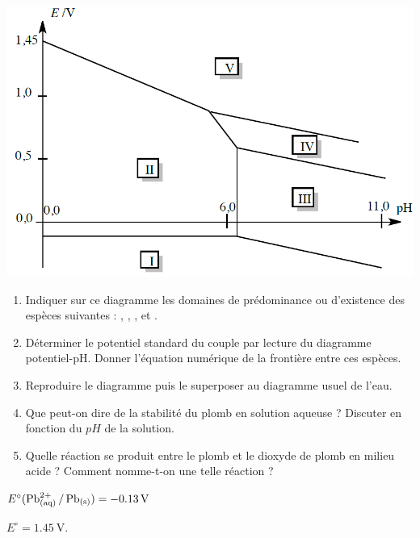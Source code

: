 \includegraphics[width=\textwidth]{Images/mpsi_s25_ex03.png}

\begin{enumerate}
	\item Indiquer sur ce diagramme les domaines de prédominance ou d'existence des espèces suivantes : , , ,  et .
	\item Déterminer le potentiel standard du couple  par lecture du diagramme potentiel-pH. Donner l'équation numérique de la frontière entre ces espèces.
	\item Reproduire le diagramme puis le superposer au diagramme usuel de l'eau. 
	\item Que peut-on dire de la stabilité du plomb en solution aqueuse ? Discuter en fonction du $pH$ de la solution.
	\item Quelle réaction se produit entre le plomb et le dioxyde de plomb en milieu acide ? Comment nomme-t-on une telle réaction ?
\end{enumerate}

 $E^\circ(\ce{Pb^{2+}_{(aq)} / Pb_{(s)}}) = \SI{-0.13}{\volt}$

 $E^\circ = \SI{1.45}{\volt}$.

